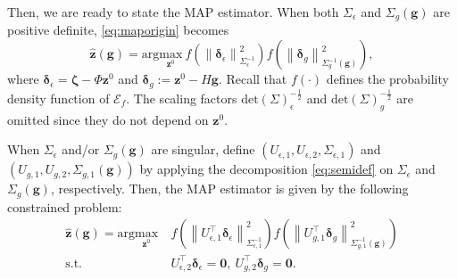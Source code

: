 \documentclass{ifacconf}
\newcommand{\norm}[1]{\left\lVert#1\right\rVert}
\newcommand{\dett}[1]{\mathrm{det}\left(#1\right)}
\begin{document}
Then, we are ready to state the MAP estimator. When both $\Sigma_\epsilon$ and $\Sigma_g(\mathbf{g})$ are positive definite, \eqref{eq:maporigin} becomes
\begin{equation}
    \hat{\mathbf{z}}(\mathbf{g})=\mathrm{arg}\underset{\mathbf{z}^0}{\mathrm{max}}\ f\left(\norm{\boldsymbol{\delta}_\epsilon}_{\Sigma_\epsilon^{-1}}^2\right)f\left(\norm{\boldsymbol{\delta}_g}_{\Sigma_g^{-1}(\mathbf{g})}^2\right),
    \label{eq:map1}
\end{equation}
where $\boldsymbol{\delta}_\epsilon=\boldsymbol{\zeta}-\Phi\mathbf{z}^0$ and $\boldsymbol{\delta}_g:=\mathbf{z}^0-H\mathbf{g}$. Recall that $f(\cdot)$ defines the probability density function of $\mathcal{E}_f$. The scaling factors $\dett\Sigma_\epsilon^{-\frac{1}{2}}$ and $\dett\Sigma_g^{-\frac{1}{2}}$ are omitted since they do not depend on $\mathbf{z}^0$.

When $\Sigma_\epsilon$ and/or $\Sigma_g(\mathbf{g})$ are singular, define $\left(U_{\epsilon,1},U_{\epsilon,2},\Sigma_{\epsilon,1}\right)$ and $\left(U_{g,1},U_{g,2},\Sigma_{g,1}(\mathbf{g})\right)$ by applying the decomposition \eqref{eq:semidef} on $\Sigma_\epsilon$ and $\Sigma_g(\mathbf{g})$, respectively. Then, the MAP estimator is given by the following constrained problem:
\begin{equation}
\begin{aligned}
    \hat{\mathbf{z}}(\mathbf{g})=\mathrm{arg}\underset{\mathbf{z}^0}{\mathrm{max}}&\ f\left(\norm{U_{\epsilon,1}^\top\boldsymbol{\delta}_\epsilon}_{\Sigma_{\epsilon,1}^{-1}}^2\right)f\left(\norm{U_{g,1}^\top\boldsymbol{\delta}_g}_{\Sigma_{g,1}^{-1}(\mathbf{g})}^2\right)\\
    \mathrm{s.t.}&\ U_{\epsilon,2}^\top\boldsymbol{\delta}_\epsilon=\mathbf{0},\ U_{g,2}^\top\boldsymbol{\delta}_g=\mathbf{0}.
    \label{eq:map2}
\end{aligned}
\end{equation}
\end{document}
